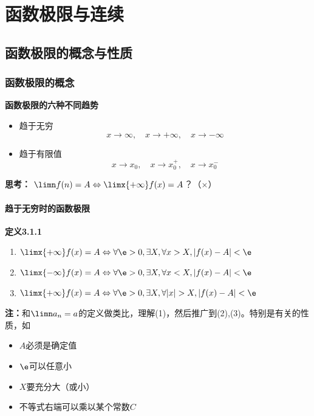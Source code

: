 \setcounter{chapter}{2}

\chapter{函数极限与连续}

\section{函数极限的概念与性质}

\subsection{函数极限的概念}

{\bf 函数极限的六种不同趋势}

\begin{itemize}
  \setlength{\itemindent}{1cm}
  \item 趋于无穷
  $$x\to\infty,\quad x\to+\infty,\quad x\to-\infty$$
  \item 趋于有限值
  $$x\to x_0,\quad x\to x_0^+,\quad x\to x_0^-$$
\end{itemize}

{\bf 思考：} $\limn f(n)=A\Leftrightarrow\limx{+\infty}f(x)=A$？（$\times$）

\subsubsection{趋于无穷时的函数极限}

{\bf 定义3.1.1}
\begin{enumerate}[(1)]
  \setlength{\itemindent}{1cm}
  \item $\limx{+\infty}f(x)=A\Leftrightarrow\forall \e>0,\exists X,\forall
  x>X,|f(x)-A|<\e$
  \item $\limx{-\infty}f(x)=A\Leftrightarrow\forall \e>0,\exists X,\forall
  x<X,|f(x)-A|<\e$
  \item $\limx{+\infty}f(x)=A\Leftrightarrow\forall \e>0,\exists X,\forall
  |x|>X,|f(x)-A|<\e$
\end{enumerate}

{\bf 注：}和$\limn a_n=a$的定义做类比，理解(1)，然后推广到(2),(3)。特别是有关的性质，如
\begin{itemize}
  \setlength{\itemindent}{1cm}
  \item $A$必须是确定值
  \item $\e$可以任意小
  \item $X$要充分大（或小）
  \item 不等式右端可以乘以某个常数$C$
\end{itemize}

